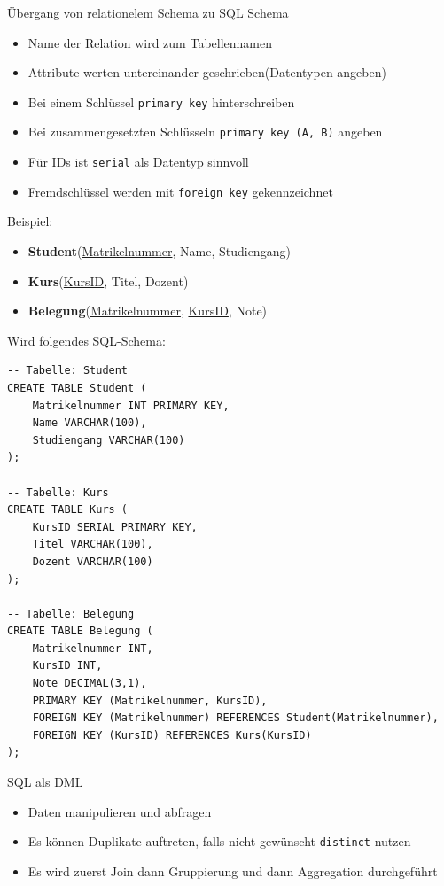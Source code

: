 \documentclass{article}
\begin{document}
\begin{block}{Übergang von relationelem Schema zu SQL Schema}
  \begin{itemize}
    \item Name der Relation wird zum Tabellennamen
    \item Attribute werten untereinander geschrieben(Datentypen angeben)
    \item Bei einem Schlüssel \texttt{primary key} hinterschreiben
    \item Bei zusammengesetzten Schlüsseln \texttt{primary key (A, B)} angeben
    \item Für IDs ist \texttt{serial} als Datentyp sinnvoll
    \item Fremdschlüssel werden mit \texttt{foreign key} gekennzeichnet
  \end{itemize}
\end{block}
Beispiel:
\begin{itemize}
  \item \textbf{Student}(\underline{Matrikelnummer}, Name, Studiengang)
  \item \textbf{Kurs}(\underline{KursID}, Titel, Dozent)
  \item \textbf{Belegung}(\underline{Matrikelnummer}, \underline{KursID}, Note)
\end{itemize}
Wird folgendes SQL-Schema:
\begin{lstlisting}
-- Tabelle: Student
CREATE TABLE Student (
    Matrikelnummer INT PRIMARY KEY,
    Name VARCHAR(100),
    Studiengang VARCHAR(100)
);

-- Tabelle: Kurs
CREATE TABLE Kurs (
    KursID SERIAL PRIMARY KEY,
    Titel VARCHAR(100),
    Dozent VARCHAR(100)
);

-- Tabelle: Belegung
CREATE TABLE Belegung (
    Matrikelnummer INT,
    KursID INT,
    Note DECIMAL(3,1),
    PRIMARY KEY (Matrikelnummer, KursID),
    FOREIGN KEY (Matrikelnummer) REFERENCES Student(Matrikelnummer),
    FOREIGN KEY (KursID) REFERENCES Kurs(KursID)
);
\end{lstlisting}

\begin{block}{SQL als DML}
  \begin{itemize}
    \item Daten manipulieren und abfragen
    \item Es können Duplikate auftreten, falls nicht gewünscht \texttt{distinct} nutzen
    \item Es wird zuerst Join dann Gruppierung und dann Aggregation durchgeführt
  \end{itemize}
\end{block}
\end{document}
